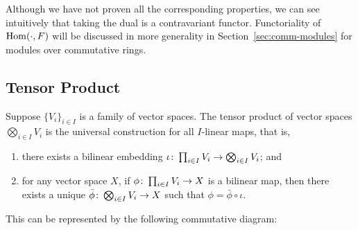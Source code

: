 \begin{remark}
    Although we have not proven all the corresponding properties,
    we can see intuitively that taking the dual is a contravariant functor.
    Functoriality of \(\operatorname{Hom}(\cdot,F)\) will be discussed in more generality
    in Section~\ref{sec:comm-modules} for modules over commutative rings.
\end{remark}
    

\subsection*{Tensor Product}

\begin{definition}
    Suppose \({\{V_i\}}_{i \in I}\) is a family of vector spaces.
    The tensor product of vector spaces \(\bigotimes_{i \in I} V_i\)
    is the universal construction for all \(I\)-linear maps, that is,
    \begin{enumerate}[label={(\roman*)}, itemsep=0mm]
        \item there exists a bilinear embedding \(\iota\colon\prod_{i \in I} V_i\to\bigotimes_{i \in I} V_i\); and
        \item for any vector space \(X\),
            if \(\phi\colon\prod_{i \in I} V_i\to X\) is a bilinear map,
            then there exists a unique \(\bar{\phi}\colon\bigotimes_{i \in I} V_i\to X\)
            such that \(\phi = \bar{\phi}\circ\iota\).
    \end{enumerate}

    This can be represented by the following commutative diagram:
    \begin{center}
    \end{center}
\end{definition}

